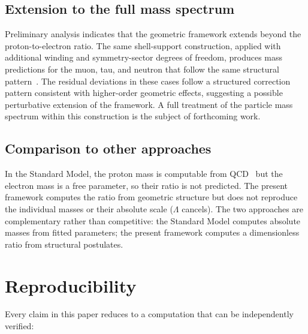 \documentclass[12pt]{article}
\begin{document}
\subsection{Extension to the full mass spectrum}

Preliminary analysis indicates that the geometric framework extends beyond the proton-to-electron ratio. The same shell-support construction, applied with additional winding and symmetry-sector degrees of freedom, produces mass predictions for the muon, tau, and neutron that follow the same structural pattern~\citep{SmartII}. The residual deviations in these cases follow a structured correction pattern consistent with higher-order geometric effects, suggesting a possible perturbative extension of the framework. A full treatment of the particle mass spectrum within this construction is the subject of forthcoming work.

\subsection{Comparison to other approaches}

In the Standard Model, the proton mass is computable from QCD~\citep{Durr2008} but the electron mass is a free parameter, so their ratio is not predicted. The present framework computes the ratio from geometric structure but does not reproduce the individual masses or their absolute scale ($\Lambda$ cancels). The two approaches are complementary rather than competitive: the Standard Model computes absolute masses from fitted parameters; the present framework computes a dimensionless ratio from structural postulates.

\section{Reproducibility}\label{sec:reproducibility}

Every claim in this paper reduces to a computation that can be independently verified:
\end{document}
